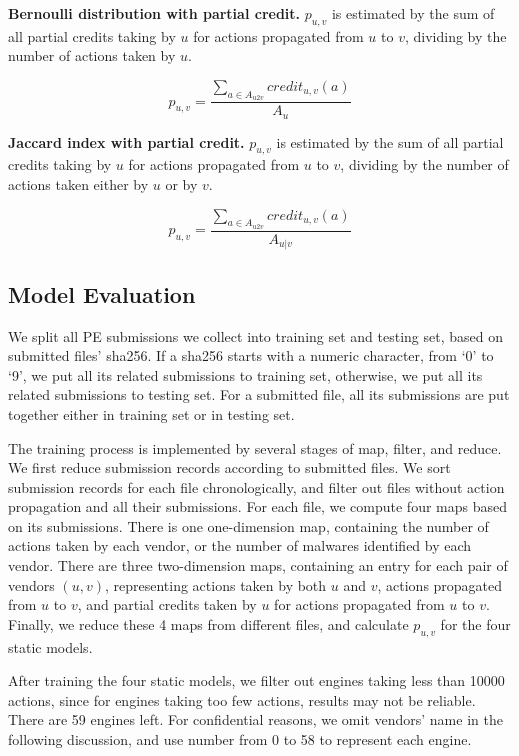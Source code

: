 {\bf Bernoulli distribution with partial credit.} 
$p_{u,v}$ is estimated by the sum of all partial credits taking by $u$ for actions propagated from $u$ to $v$, 
dividing by the number of actions taken by $u$. 

$$p_{u,v} = \frac{\sum\limits_{a \in A_{u2v}}{credit_{u,v}(a)}}{A_u}$$

{\bf Jaccard index with partial credit.} 
$p_{u,v}$ is estimated by the sum of all partial credits taking by $u$ for actions propagated from $u$ to $v$, 
dividing by the number of actions taken either by $u$ or by $v$. 

$$p_{u,v} = \frac{\sum\limits_{a \in A_{u2v}}{credit_{u,v}(a)}}{A_{u|v}}$$




\subsection{Model Evaluation}
\label{sec:predict}

We split all PE submissions we collect into training set and testing set, based on submitted files' sha256. 
If a sha256 starts with a numeric character, 
from ‘0’ to ‘9’, we put all its related submissions to training set, 
otherwise, we put all its related submissions to testing set.  
For a submitted file, all its submissions are put together either in training set or in testing set. 

The training process is implemented by several stages of map, filter, and reduce. 
We first reduce submission records according to submitted files. 
We sort submission records for each file chronologically, 
and filter out files without action propagation and all their submissions. 
For each file, we compute four maps based on its submissions.
There is one one-dimension map, 
containing the number of actions taken by each vendor, 
or the number of malwares identified by each vendor. 
There are three two-dimension maps, 
containing an entry for each pair of vendors $(u,v)$, 
representing actions taken by both $u$ and $v$, actions propagated from $u$ to $v$, 
and partial credits taken by $u$ for actions propagated from $u$ to $v$. 
Finally, we reduce these 4 maps from different files, 
and calculate $p_{u,v}$ for the four static models. 

After training the four static models, 
we filter out engines taking less than 10000 actions,
since for engines taking too few actions, results may not be reliable. 
There are 59 engines left.
For confidential reasons, we omit vendors’ name in the following discussion, 
and use number from 0 to 58 to represent each engine. 

